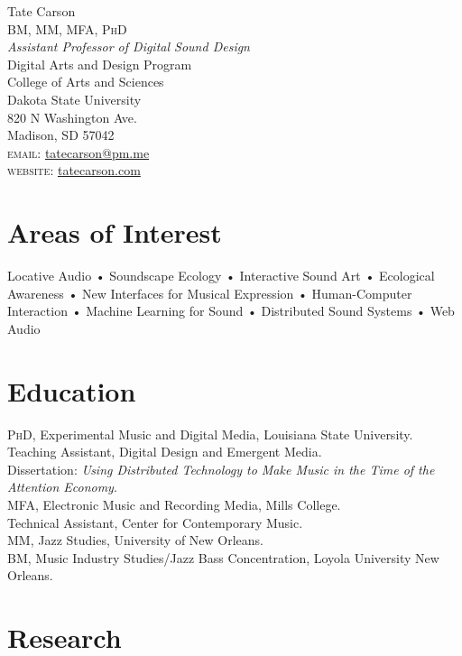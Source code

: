 \documentclass[12pt, a4paper]{article}
\newcommand{\years}[1]{\marginnote{\scriptsize #1}}
\begin{document}
{\Huge Tate Carson}\\[0.1cm]
\textsc{BM, MM, MFA, PhD}\\[0.9cm]
\emph{Assistant Professor of Digital Sound Design}\\
Digital Arts and Design Program \\
College of Arts and Sciences\\
Dakota State University \\ 
820 N Washington Ave.\\
Madison, SD 57042 \\[.2cm]

\textsc{email}: \href{mailto:tatecarson@pm.me}{tatecarson@pm.me}\\
\textsc{website}: \href{https://tatecarson.com}{tatecarson.com}


\section*{Areas of Interest}
Locative Audio • Soundscape Ecology • Interactive Sound Art • Ecological Awareness • New Interfaces for Musical Expression • Human-Computer Interaction • Machine Learning for Sound • Distributed Sound Systems • Web Audio

\section*{Education}
\noindent
\years{2021}\textsc{PhD}, Experimental Music and Digital Media, Louisiana State University.\\
Teaching Assistant, Digital Design and Emergent Media. \\
Dissertation: \emph{Using Distributed Technology to Make Music in the Time of the Attention Economy}.\\
\years{2017}\textsc{MFA}, Electronic Music and Recording Media, Mills College.\\
Technical Assistant, Center for Contemporary Music.\\
\years{2011}\textsc{MM}, Jazz Studies, University of New Orleans.\\
\years{2009}\textsc{BM}, Music Industry Studies/Jazz Bass Concentration, Loyola University New Orleans.

\section*{Research}
\end{document}
